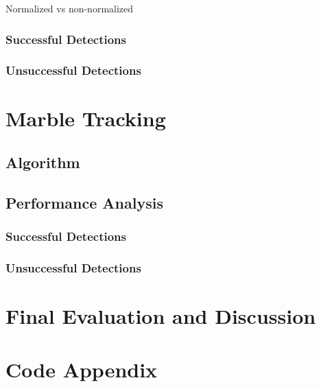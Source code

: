 \documentclass[10pt,a4paper,onecolumn]{report}
\begin{document}
Normalized vs non-normalized

\subsection{Successful Detections}

\subsection{Unsuccessful Detections}

\chapter{Marble Tracking}

\section{Algorithm}


\section{Performance Analysis}

\subsection{Successful Detections}

\subsection{Unsuccessful Detections}

\chapter{Final Evaluation and Discussion}

\chapter{Code Appendix}
\end{document}
